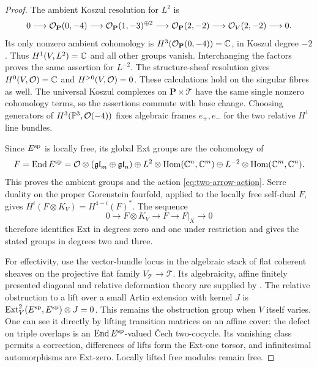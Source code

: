 \begin{proof}
The ambient Koszul resolution for $L^2$ is
\begin{equation}\label{eq:line-koszul}
 0\longrightarrow\mathcal O_{\mathbf P}(0,-4)
 \longrightarrow\mathcal O_{\mathbf P}(1,-3)^{\oplus2}
 \longrightarrow\mathcal O_{\mathbf P}(2,-2)
 \longrightarrow\mathcal O_V(2,-2)\longrightarrow0.
\end{equation}
Its only nonzero ambient cohomology is
$H^3(\mathcal O_{\mathbf P}(0,-4))=\mathbb C$, in Koszul degree $-2$.
Thus $H^1(V,L^2)=\mathbb C$ and all other groups vanish.
Interchanging the factors proves the same assertion for
$L^{-2}$. The structure-sheaf resolution gives
$H^0(V,\mathcal O)=\mathbb C$ and $H^{>0}(V,\mathcal O)=0$.
These calculations hold on the singular fibres as well.
The universal Koszul complexes on $\mathbf P\times\mathcal T$
have the same single nonzero cohomology terms, so the assertions
commute with base change. Choosing generators of
$H^3(\mathbb P^3,\mathcal O(-4))$ fixes algebraic frames $e_+,e_-$
for the two relative $H^1$ line bundles.

Since $E^{\rm sp}$ is locally free, its global Ext groups are
the cohomology of
\[
 F=\operatorname{End} E^{\rm sp}
 =\mathcal O\otimes(\mathfrak{gl}_m\oplus\mathfrak{gl}_n)
 \oplus L^2\otimes\operatorname{Hom}(\mathbb C^n,\mathbb C^m)
 \oplus L^{-2}\otimes\operatorname{Hom}(\mathbb C^m,\mathbb C^n).
\]
This proves the ambient groups and the action
\eqref{eq:two-arrow-action}. Serre duality on the proper
Gorenstein fourfold, applied to the locally free self-dual
$F$, gives $H^i(F\otimes K_V)=H^{4-i}(F)^*$.
The sequence
\begin{equation}\label{eq:anticanonical-restriction}
 0\longrightarrow F\otimes K_V\longrightarrow F
           \longrightarrow F|_X\longrightarrow0
\end{equation}
therefore identifies Ext in degrees zero and one under
restriction and gives the stated groups in degrees two and three.

For effectivity, use the vector-bundle locus in the algebraic
stack of flat coherent sheaves on the projective flat family
$V_{\mathcal T}\to\mathcal T$. Its algebraicity, affine
finitely presented diagonal and relative deformation theory
are supplied by \cite[Tags 09DS, 0DLY, 0DLZ, 08VW and 08WA]{Stacks}.
The relative obstruction to a lift over a small Artin extension
with kernel $J$ is $\operatorname{Ext}^2_V(E^{\rm sp},E^{\rm sp})\otimes J=0$.
This remains the obstruction group when $V$ itself varies.
One can see it directly by lifting transition matrices on an
affine cover: the defect on triple overlaps is an
$\operatorname{End} E^{\rm sp}$-valued Čech two-cocycle. Its vanishing class
permits a correction, differences of lifts form the Ext-one
torsor, and infinitesimal automorphisms are Ext-zero.
Locally lifted free modules remain free.


\end{proof}
